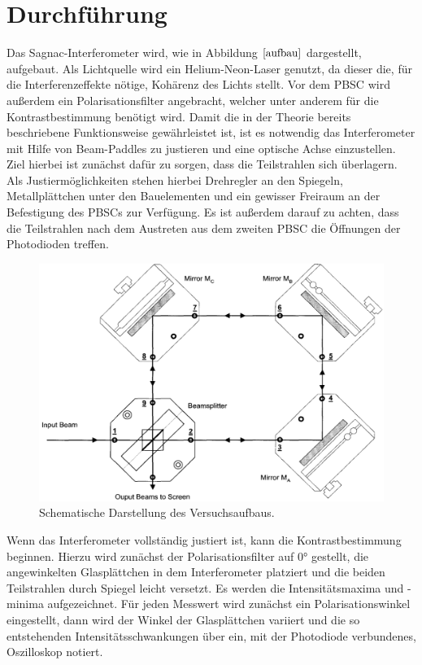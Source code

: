 \section{Durchführung}
Das Sagnac-Interferometer wird, wie in Abbildung $\ref{aufbau}$ dargestellt, aufgebaut. Als Lichtquelle wird ein Helium-Neon-Laser genutzt, da dieser die, für die Interferenzeffekte nötige, Kohärenz des Lichts stellt.
Vor dem PBSC wird außerdem ein Polarisationsfilter angebracht, welcher unter anderem für die Kontrastbestimmung benötigt wird. Damit die in der Theorie bereits beschriebene Funktionsweise gewährleistet ist,
ist es notwendig das Interferometer mit Hilfe von Beam-Paddles zu justieren und eine optische Achse einzustellen. Ziel hierbei ist zunächst dafür zu sorgen, dass die Teilstrahlen sich überlagern. Als Justiermöglichkeiten
stehen hierbei Drehregler an den Spiegeln, Metallplättchen unter den Bauelementen und ein gewisser Freiraum an der Befestigung des PBSCs zur Verfügung. Es ist außerdem darauf zu achten, dass die Teilstrahlen
nach dem Austreten aus dem zweiten PBSC die Öffnungen der Photodioden treffen.
\begin{figure}[H]
  \centering
  \includegraphics[scale=0.4]{Bilder/skizze2.png}
  \caption{Schematische Darstellung des Versuchsaufbaus.\cite{anleitung}}
  \label{aufbau}
\end{figure}
Wenn das Interferometer vollständig justiert ist, kann die Kontrastbestimmung beginnen. Hierzu wird zunächst der Polarisationsfilter auf $0°$ gestellt, die angewinkelten Glasplättchen in dem Interferometer platziert
und die beiden Teilstrahlen durch Spiegel leicht versetzt.
Es werden die Intensitätsmaxima und -minima aufgezeichnet. Für jeden Messwert wird zunächst ein Polarisationswinkel eingestellt, dann wird der Winkel der Glasplättchen variiert und die so entstehenden
Intensitätsschwankungen über ein, mit der Photodiode verbundenes, Oszilloskop notiert.
